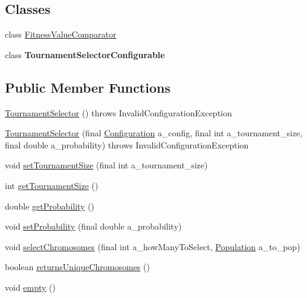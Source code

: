 \subsection*{Classes}
\begin{DoxyCompactItemize}
\item 
class \hyperlink{classorg_1_1jgap_1_1impl_1_1_tournament_selector_1_1_fitness_value_comparator}{Fitness\-Value\-Comparator}
\item 
class {\bfseries Tournament\-Selector\-Configurable}
\end{DoxyCompactItemize}
\subsection*{Public Member Functions}
\begin{DoxyCompactItemize}
\item 
\hyperlink{classorg_1_1jgap_1_1impl_1_1_tournament_selector_aa8e74d4e462d2e1a646d7d307c2d7296}{Tournament\-Selector} ()  throws Invalid\-Configuration\-Exception 
\item 
\hyperlink{classorg_1_1jgap_1_1impl_1_1_tournament_selector_ad3dd06b3dd8f08415e6cf1ee9aa6e3e7}{Tournament\-Selector} (final \hyperlink{classorg_1_1jgap_1_1_configuration}{Configuration} a\-\_\-config, final int a\-\_\-tournament\-\_\-size, final double a\-\_\-probability)  throws Invalid\-Configuration\-Exception 
\item 
void \hyperlink{classorg_1_1jgap_1_1impl_1_1_tournament_selector_a3f73de4ff543909da325daae2dc60509}{set\-Tournament\-Size} (final int a\-\_\-tournament\-\_\-size)
\item 
int \hyperlink{classorg_1_1jgap_1_1impl_1_1_tournament_selector_a344c57b936622cf29cffd0f2b4b83f92}{get\-Tournament\-Size} ()
\item 
double \hyperlink{classorg_1_1jgap_1_1impl_1_1_tournament_selector_a6ae189d5af329d6106270505b183abac}{get\-Probability} ()
\item 
void \hyperlink{classorg_1_1jgap_1_1impl_1_1_tournament_selector_a16d14b860632a790de2efc6cfa876003}{set\-Probability} (final double a\-\_\-probability)
\item 
void \hyperlink{classorg_1_1jgap_1_1impl_1_1_tournament_selector_a138ac797f8f77f92bd58b950b05fc20b}{select\-Chromosomes} (final int a\-\_\-how\-Many\-To\-Select, \hyperlink{classorg_1_1jgap_1_1_population}{Population} a\-\_\-to\-\_\-pop)
\item 
boolean \hyperlink{classorg_1_1jgap_1_1impl_1_1_tournament_selector_a0254281e4830d7521643903e172296ec}{returns\-Unique\-Chromosomes} ()
\item 
void \hyperlink{classorg_1_1jgap_1_1impl_1_1_tournament_selector_a2d31ee0259fe57f59ccbc9951c4c8eda}{empty} ()
\end{DoxyCompactItemize}
